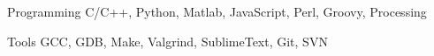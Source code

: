 

\begin{cvskills}

  \cvskill
    {Programming} %
    {C/C++, Python, Matlab, JavaScript, Perl, Groovy, Processing} %

  \cvskill
    {Tools} %
    {GCC, GDB, Make, Valgrind, SublimeText, Git, SVN} %

\end{cvskills}
